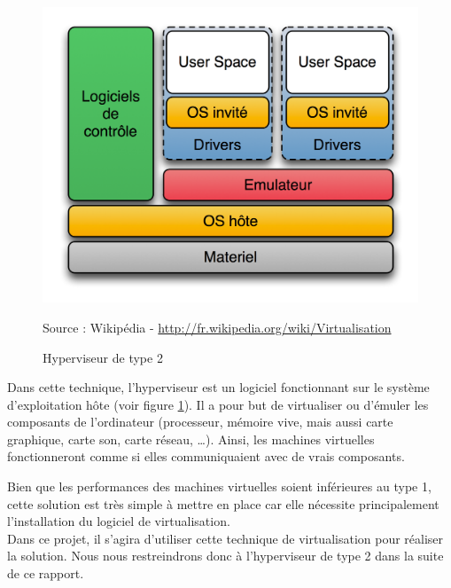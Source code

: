 \begin{figure}[!h]
	\center
	\includegraphics[scale=0.7]{img/Hyperviseur_type2.png}
	\caption{Hyperviseur de type 2}
	Source : Wikipédia - \href{http://fr.wikipedia.org/wiki/Virtualisation}{http://fr.wikipedia.org/wiki/Virtualisation}
	\label{Schéma Hyperviseur 2}
\end{figure}

Dans cette technique, l'hyperviseur est un logiciel fonctionnant sur le système d'exploitation hôte (voir figure \ref{Schéma Hyperviseur 2}).
Il a pour but de virtualiser ou d'émuler les composants de l'ordinateur (processeur, mémoire vive, mais aussi carte graphique, carte son, carte réseau, \ldots).
Ainsi, les machines virtuelles fonctionneront comme si elles communiquaient avec de vrais composants.

Bien que les performances des machines virtuelles soient inférieures au type 1, cette solution est très simple à mettre en place car elle nécessite principalement l'installation du logiciel de virtualisation.
\\


Dans ce projet, il s'agira d'utiliser cette technique de virtualisation pour réaliser la solution.
Nous nous restreindrons donc à l'hyperviseur de type 2 dans la suite de ce rapport.
\\





